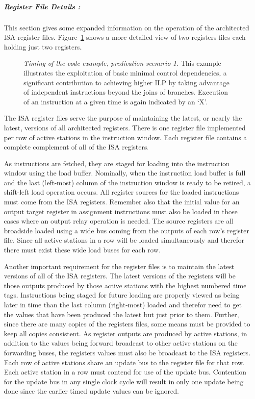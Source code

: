 
\subparagraph{Register File Details : }
This section gives some expanded information on the operation
of the architected ISA register files.
Figure~\ref{registers2} shows a more detailed view
of two registers files each holding just two registers.

\begin{figure}
\centering
{}
\caption{{\em Timing of the code example, predication scenario 1.}
This example illustrates the exploitation of basic minimal control
dependencies, a significant contribution to
achieving higher ILP by taking advantage of independent
instructions beyond the joins of branches.
Execution of an instruction at a given time is
again indicated by an `X'.}
\label{registers2}
\end{figure}

The ISA register files serve the purpose
of maintaining the latest, or nearly the latest, versions of
all architected registers.  There is one register file
implemented per row of active stations in the instruction window.
Each register file contains a complete complement of all of
the ISA registers.

As instructions are fetched, they are staged for loading into the
instruction window using the load buffer.  Nominally, when the
instruction load buffer is full and the last (left-most) column of the
instruction window is ready to be retired, a shift-left load
operation occurs.  All register sources for the loaded instructions
must come from the ISA registers.  Remember also that the initial
value for an output target register in assignment instructions
must also be loaded in those cases where an output relay operation 
is needed.  The source registers are all broadside loaded
using a wide bus coming from the outputs of each row's register 
file.  Since all active stations in a row
will be loaded simultaneously and therefor there must exist
these wide load buses for each row.

Another important requirement for the register files is to
maintain the latest versions of all of the ISA registers.
The latest versions of the registers will be those outputs
produced by those active stations with the highest numbered
time tags.  Instructions being staged for future loading
are properly viewed as being later in time than the last
column (right-most) loaded and therefor need to get the
values that have been produced the latest but just prior to them.
Further, since there are many copies of the registers
files, some means must be provided to keep all copies
consistent.
As register outputs are produced by active stations, in addition
to the values being forward broadcast to other active
stations on the forwarding buses,
the registers values must also be broadcast to the ISA registers.
Each row of active stations share an update bus to the register
file for that row.  Each active station in a row must contend
for use of the update bus.  Contention for the update bus
in any single clock cycle will result in only one update being
done since the earlier timed update values can be ignored.

